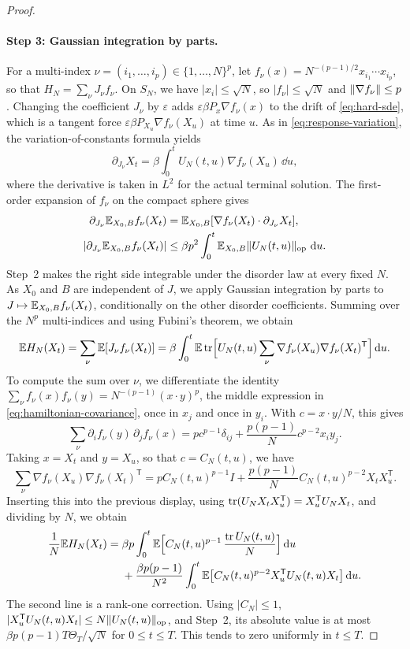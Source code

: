 \begin{proof}
\paragraph{Step 3: Gaussian integration by parts.}
For a multi-index $\nu=(i_1,\dots,i_p)\in\{1,\dots,N\}^p$, let $f_\nu(x)=N^{-(p-1)/2}x_{i_1}\cdots x_{i_p}$, so that $H_N=\sum_\nu J_\nu f_\nu$. On $S_N$, we have $|x_i|\le\sqrt N$, so $|f_\nu|\le\sqrt N$ and $\lVert\nabla f_\nu\rVert\le p$. Changing the coefficient $J_\nu$ by $\varepsilon$ adds $\varepsilon\beta P_x\nabla f_\nu(x)$ to the drift of \eqref{eq:hard-sde}, which is a tangent force $\varepsilon\beta P_{X_u}\nabla f_\nu(X_u)$ at time $u$. As in \eqref{eq:response-variation}, the variation-of-constants formula yields
\begin{equation}\label{eq:disorder-variation}
 \partial_{J_\nu}X_t=\beta\int_0^tU_N(t,u)\nabla f_\nu(X_u)\,\dd u,
\end{equation}
where the derivative is taken in $L^2$ for the actual terminal solution. The first-order expansion of $f_\nu$ on the compact sphere gives
\[
\begin{aligned}
 \partial_{J_\nu}\mathbb E_{X_0,B}f_\nu(X_t)
 &=\mathbb E_{X_0,B}[\nabla f_\nu(X_t)\cdot\partial_{J_\nu}X_t],\\
 \left|\partial_{J_\nu}\mathbb E_{X_0,B}f_\nu(X_t)\right|
 &\le\beta p^2\int_0^t\mathbb E_{X_0,B}\lVert U_N(t,u)\rVert_{\mathrm{op}}\,\mathop{}\!\mathrm d u.
\end{aligned}
\]
Step~2 makes the right side integrable under the disorder law at every fixed $N$. As $X_0$ and $B$ are independent of $J$, we apply Gaussian integration by parts to $J\mapsto\mathbb E_{X_0,B}f_\nu(X_t)$, conditionally on the other disorder coefficients. Summing over the $N^p$ multi-indices and using Fubini's theorem, we obtain
\[
 \mathbb E H_N(X_t)=\sum_\nu\mathbb E[J_\nu f_\nu(X_t)]
 =\beta\int_0^t\mathbb E\operatorname{tr}\Bigl[U_N(t,u)\sum_\nu\nabla f_\nu(X_u)\nabla f_\nu(X_t)^{\mathsf T}\Bigr]\mathop{}\!\mathrm d u.
\]
To compute the sum over $\nu$, we differentiate the identity $\sum_\nu f_\nu(x)f_\nu(y)=N^{-(p-1)}(x\cdot y)^p$, the middle expression in \eqref{eq:hamiltonian-covariance}, once in $x_j$ and once in $y_i$. With $c=x\cdot y/N$, this gives
\[
 \sum_\nu\partial_if_\nu(y)\,\partial_jf_\nu(x)=pc^{p-1}\delta_{ij}+\frac{p(p-1)}Nc^{p-2}x_iy_j.
\]
Taking $x=X_t$ and $y=X_u$, so that $c=C_N(t,u)$, we have
\[
 \sum_\nu\nabla f_\nu(X_u)\nabla f_\nu(X_t)^{\mathsf T}
 =pC_N(t,u)^{p-1}I+\frac{p(p-1)}NC_N(t,u)^{p-2}X_tX_u^{\mathsf T}.
\]
Inserting this into the previous display, using $\operatorname{tr}(U_NX_tX_u^{\mathsf T})=X_u^{\mathsf T}U_NX_t$, and dividing by $N$, we obtain
\begin{align}
\frac1N\mathbb E H_N(X_t)
={}&\beta p\int_0^t
 \mathbb E\Bigl[C_N(t,u)^{p-1}\,\frac{\operatorname{tr} U_N(t,u)}N\Bigr]\mathop{}\!\mathrm d u
 \nonumber\\
&+\frac{\beta p(p-1)}{N^2}\int_0^t
 \mathbb E\bigl[C_N(t,u)^{p-2}X_u^{\mathsf T}U_N(t,u)X_t\bigr]\mathop{}\!\mathrm d u.
\label{eq:hard-energy-ibp}
\end{align}
The second line is a rank-one correction. Using $|C_N|\le1$, $|X_u^{\mathsf T}U_N(t,u)X_t|\le N\lVert U_N(t,u)\rVert_{\mathrm{op}}$, and Step~2, its absolute value is at most $\beta p(p-1)T\Theta_T/\sqrt N$ for $0\le t\le T$. This tends to zero uniformly in $t\le T$.


\end{proof}

